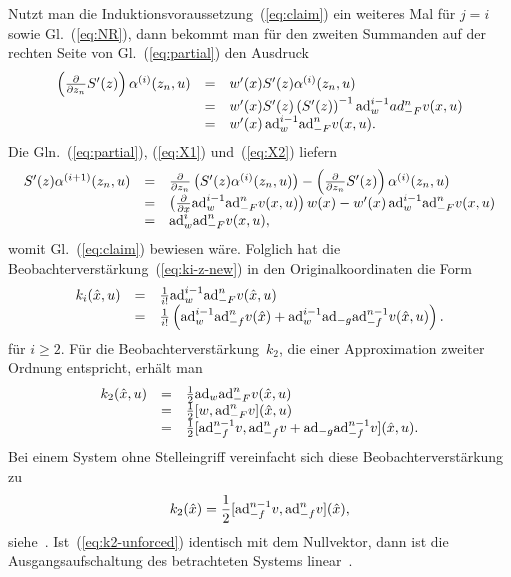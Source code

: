 Nutzt man die Induktionsvoraussetzung~(\ref{eq:claim}) ein weiteres
Mal für $j=i$ sowie Gl.~(\ref{eq:NR}), dann bekommt man für den
zweiten Summanden auf der rechten Seite von Gl.~(\ref{eq:partial})
den Ausdruck 
\begin{equation}
\begin{array}{ccl}
\left(\frac{\partial}{\partial z_{n}}S^{\prime}(z)\right)\alpha^{(i)}(z_{n},u) & = & w^{\prime}(x)S^{\prime}(z)\alpha^{(i)}(z_{n},u)\\
 & = & w^{\prime}(x)S^{\prime}(z)\left(S^{\prime}(z)\right)^{-1}{\operatorname{ad}}_{w}^{i-1}ad_{-F}^{n}v(x,u)\\
 & = & w^{\prime}(x)\,{\operatorname{ad}}_{w}^{i-1}{\operatorname{ad}}_{-F}^{n}v(x,u).
\end{array}\label{eq:X2}
\end{equation}
Die Gln.~(\ref{eq:partial}), (\ref{eq:X1}) und~(\ref{eq:X2})
liefern
\[
\begin{array}{ccl}
S^{\prime}(z)\alpha^{(i+1)}(z_{n},u) & = & \frac{\partial}{\partial z_{n}}\left(S^{\prime}(z)\alpha^{(i)}(z_{n},u)\right)-\left(\frac{\partial}{\partial z_{n}}S^{\prime}(z)\right)\alpha^{(i)}(z_{n},u)\\
 & = & \left(\frac{\partial}{\partial x}{\operatorname{ad}}_{w}^{i-1}{\operatorname{ad}}_{-F}^{n}v(x,u)\right)w(x)-w^{\prime}(x)\,{\operatorname{ad}}_{w}^{i-1}{\operatorname{ad}}_{-F}^{n}v(x,u)\\
 & = & {\operatorname{ad}}_{w}^{i}{\operatorname{ad}}_{-F}^{n}v(x,u),
\end{array}
\]
womit Gl.~(\ref{eq:claim}) bewiesen wäre. Folglich hat die Beobachterverstärkung~(\ref{eq:ki-z-new})
in den Originalkoordinaten die Form 
\begin{equation}
\begin{array}{lcl}
k_{i}(\hat{x},u) & = & \frac{1}{i!}{\operatorname{ad}}_{w}^{i-1}{\operatorname{ad}}_{-F}^{n}v(\hat{x},u)\\
 & = & \frac{1}{i!}\left({\operatorname{ad}}_{w}^{i-1}{\operatorname{ad}}_{-f}^{n}v(\hat{x})+{\operatorname{ad}}_{w}^{i-1}{\operatorname{ad}}_{-g}{\operatorname{ad}}_{-f}^{n-1}v(\hat{x},u)\right).
\end{array}\label{eq:ki-x-new}
\end{equation}
für $i\geq2$. Für die Beobachterverstärkung~$k_{2}$, die einer
Approximation zweiter Ordnung entspricht, erhält man 
\[
\begin{array}{lcl}
k_{2}(\hat{x},u) & = & \frac{1}{2}{\operatorname{ad}}_{w}{\operatorname{ad}}_{-F}^{n}v(\hat{x},u)\\
 & = & \frac{1}{2}[w,{\operatorname{ad}}_{-F}^{n}v](\hat{x},u)\\
 & = & \frac{1}{2}[{\operatorname{ad}}_{-f}^{n-1}v,{\operatorname{ad}}_{-f}^{n}v+{\operatorname{ad}}_{-g}{\operatorname{ad}}_{-f}^{n-1}v](\hat{x},u).
\end{array}
\]
Bei einem System ohne Stelleingriff vereinfacht sich diese Beobachterverstärkung
zu 
\begin{equation}
k_{2}(\hat{x})=\frac{1}{2}[{\operatorname{ad}}_{-f}^{n-1}v,{\operatorname{ad}}_{-f}^{n}v](\hat{x}),\label{eq:k2-unforced}
\end{equation}
siehe~\cite{roebenack2004pamm}. Ist~(\ref{eq:k2-unforced}) identisch
mit dem Nullvektor, dann ist die Ausgangsaufschaltung des betrachteten
Systems linear~\cite[Prop.~2]{krener83}.

